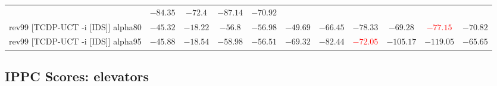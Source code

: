 \documentclass{article}
\begin{document}
\begin{tabular}{|l|r@{$\pm$}rr@{$\pm$}rr@{$\pm$}rr@{$\pm$}rr@{$\pm$}rr@{$\pm$}rr@{$\pm$}rr@{$\pm$}rr@{$\pm$}rr@{$\pm$}r|}
& \multicolumn{2}{c}{$-84.35$}
& \multicolumn{2}{c}{$-72.4$}
& \multicolumn{2}{c}{$-87.14$}
& \multicolumn{2}{c|}{$-70.92$}
\\
rev99 [TCDP-UCT -i [IDS]] alpha80
& \multicolumn{2}{c}{$-45.32$}
& \multicolumn{2}{c}{$-18.22$}
& \multicolumn{2}{c}{$-56.8$}
& \multicolumn{2}{c}{$-56.98$}
& \multicolumn{2}{c}{$-49.69$}
& \multicolumn{2}{c}{\textbf{$-66.45$}}
& \multicolumn{2}{c}{$-78.33$}
& \multicolumn{2}{c}{\textbf{$-69.28$}}
& \multicolumn{2}{c}{\textbf{\textcolor{red}{$-77.15$}}}
& \multicolumn{2}{c|}{$-70.82$}
\\
rev99 [TCDP-UCT -i [IDS]] alpha95
& \multicolumn{2}{c}{$-45.88$}
& \multicolumn{2}{c}{$-18.54$}
& \multicolumn{2}{c}{$-58.98$}
& \multicolumn{2}{c}{$-56.51$}
& \multicolumn{2}{c}{$-69.32$}
& \multicolumn{2}{c}{$-82.44$}
& \multicolumn{2}{c}{\textbf{\textcolor{red}{$-72.05$}}}
& \multicolumn{2}{c}{$-105.17$}
& \multicolumn{2}{c}{$-119.05$}
& \multicolumn{2}{c|}{$-65.65$}
\\
\hline
\end{tabular}%

\bigskip

\subsection*{IPPC Scores: elevators}
\end{document}

